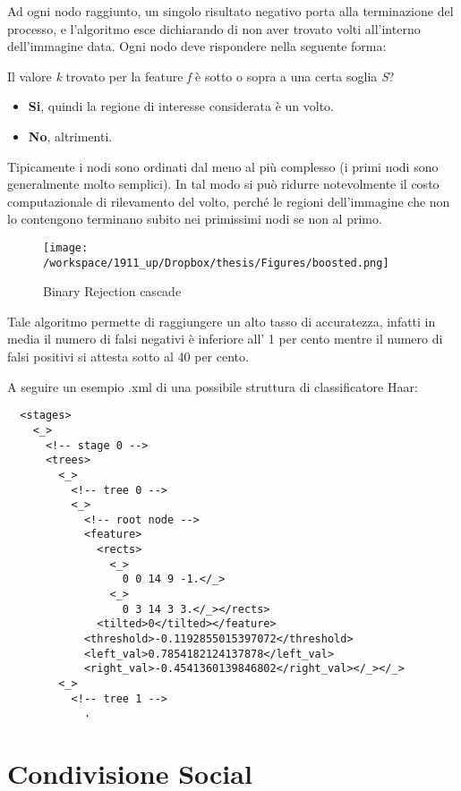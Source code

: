 Ad ogni nodo raggiunto, un singolo risultato negativo porta alla terminazione del processo, e l'algoritmo esce dichiarando di non aver trovato volti all'interno dell'immagine data. Ogni nodo deve rispondere nella seguente forma: 

Il valore \textit{k} trovato per la feature \textit{f} è sotto o sopra a una certa soglia \textit{S}? 
\begin{itemize}
\item \textbf{Si}, quindi la regione di interesse considerata è un volto.
\item \textbf{No}, altrimenti.
\end{itemize}

Tipicamente i nodi sono ordinati dal meno al più complesso (i primi nodi sono generalmente molto semplici). In tal modo si può ridurre notevolmente il costo computazionale di rilevamento del volto, perché le regioni dell'immagine che non lo contengono terminano subito nei primissimi nodi se non al primo.

\begin{figure}[H]\centering  
\texttt{[image: /workspace/1911\_up/Dropbox/thesis/Figures/boosted.png]}
\caption[Binary Rejection cascade]{Binary Rejection cascade}
\label{pic-a}
\end{figure}

Tale algoritmo permette di raggiungere un alto tasso di accuratezza, infatti in media il numero di falsi negativi è inferiore all' 1 per cento mentre il numero di falsi positivi si attesta sotto al 40 per cento.

A seguire un esempio .xml di una possibile struttura di classificatore Haar:
\begin{lstlisting}
  <stages>
    <_>
      <!-- stage 0 -->
      <trees>
        <_>
          <!-- tree 0 -->
          <_>
            <!-- root node -->
            <feature>
              <rects>
                <_>
                  0 0 14 9 -1.</_>
                <_>
                  0 3 14 3 3.</_></rects>
              <tilted>0</tilted></feature>
            <threshold>-0.1192855015397072</threshold>
            <left_val>0.7854182124137878</left_val>
            <right_val>-0.4541360139846802</right_val></_></_>
        <_>
          <!-- tree 1 -->
			.
\end{lstlisting}
\section{Condivisione Social}


